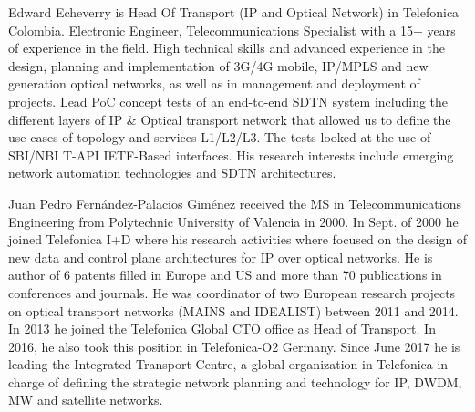 \documentclass[a4paper,fleqn]{cas-dc}
\begin{document}
Edward Echeverry is Head Of Transport (IP and Optical Network) in Telefonica Colombia. Electronic Engineer, Telecommunications Specialist with a 15+ years of experience in the field. High technical skills and advanced experience in the design, planning and implementation of 3G/4G mobile, IP/MPLS and new generation optical networks, as well as in management and deployment of projects. Lead PoC concept tests of an end-to-end SDTN system including the different layers of IP \& Optical transport network that allowed us to define the use cases of topology and services L1/L2/L3. The tests looked at the use of SBI/NBI T-API IETF-Based interfaces. His research interests include emerging network automation technologies and SDTN architectures.
\endbio

Juan Pedro Fernández-Palacios Giménez received the MS in Telecommunications Engineering from Polytechnic University of Valencia in 2000. In Sept. of 2000 he joined Telefonica I+D where his research activities where focused on the design of new data and control plane architectures for IP over optical networks. He is author of 6 patents filled in Europe and US and more than 70 publications in conferences and journals. He was coordinator of two European research projects on optical transport networks (MAINS and IDEALIST) between 2011 and 2014. In 2013 he joined the Telefonica Global CTO office as Head of Transport. In 2016, he also took this position in Telefonica-O2 Germany. Since June 2017 he is leading the Integrated Transport Centre, a global organization in Telefonica in charge of defining the strategic network planning and technology for IP, DWDM, MW and satellite networks.
\endbio
\end{document}
